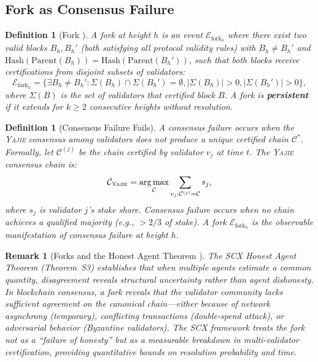\documentclass[11pt,a4paper]{article}
\newtheorem{definition}[theorem]{Definition}
\newtheorem{remark}[theorem]{Remark}
\theoremstyle{definition}
\newcommand{\Yajie}{\textsc{Yajie}}
\newcommand{\SCX}{\textsc{SCX}}
\DeclareMathOperator*{\argmax}{arg\,max}
\newcommand{\forkEvent}{\mathcal{E}_{\mathrm{fork}}}
\newcommand{\ThmSCXHonest}{Theorem~S3}
\begin{document}
\subsection{Fork as Consensus Failure}
\begin{definition}[Fork ]
\label{def:fork}
A fork at height $h$ is an event $\forkEvent_h$ where there exist two valid blocks $B_h, B_h'$ (both satisfying all protocol validity rules) with $B_h \neq B_h'$ and $\mathrm{Hash}(\mathrm{Parent}(B_h)) = \mathrm{Hash}(\mathrm{Parent}(B_h'))$, such that both blocks receive certifications from disjoint subsets of validators:
\begin{equation}
    \forkEvent_h = \{\exists B_h \neq B_h' : \Sigma(B_h) \cap \Sigma(B_h') = \emptyset, |\Sigma(B_h)| > 0, |\Sigma(B_h')| > 0\},
    \label{eq:fork_event}
\end{equation}
where $\Sigma(B)$ is the set of validators that certified block $B$. A fork is \textbf{persistent} if it extends for $k \geq 2$ consecutive heights without resolution.
\end{definition}
\begin{definition}[Consensus Failure Fails]
\label{def:consensus_failure}
A consensus failure occurs when the \Yajie{} consensus among validators does not produce a unique certified chain $\mathcal{C}^*$. Formally, let $\mathcal{C}^{(j)}$ be the chain certified by validator $v_j$ at time $t$. The \Yajie{} consensus chain is:
\begin{equation}
    \mathcal{C}_{\Yajie} = \argmax_{\mathcal{C}} \sum_{v_j: \mathcal{C}^{(j)} = \mathcal{C}} s_j,
    \label{eq:yajie_chain}
\end{equation}
where $s_j$ is validator $j$'s stake share. Consensus failure occurs when no chain achieves a qualified majority (e.g., $>2/3$ of stake). A fork $\forkEvent_h$ is the observable manifestation of consensus failure at height $h$.
\end{definition}
\begin{remark}[Forks and the Honest Agent Theorem ]
\label{rem:fork_honest}
The \SCX{} Honest Agent Theorem (\ThmSCXHonest) establishes that when multiple agents estimate a common quantity, disagreement reveals structural uncertainty rather than agent dishonesty. In blockchain consensus, a fork reveals that the validator community lacks sufficient agreement on the canonical chain—either because of network asynchrony (temporary), conflicting transactions (double-spend attack), or adversarial behavior (Byzantine validators). The \SCX{} framework treats the fork not as a ``failure of honesty'' but as a \textit{measurable} breakdown in multi-validator certification, providing quantitative bounds on resolution probability and time.
\end{remark}
\end{document}
